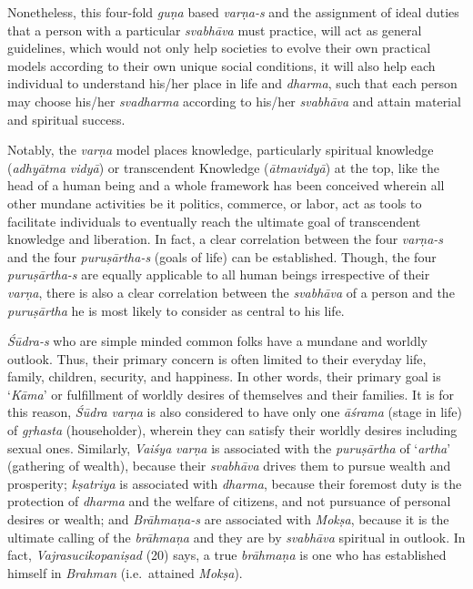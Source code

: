 Nonetheless, this four-fold \emph{guṇa} based \emph{varṇa-s} and the assignment of ideal duties that a person with a particular \emph{svabhāva} must practice, will act as general guidelines, which would not only help societies to evolve their own practical models according to their own unique social conditions, it will also help each individual to understand his/her place in life and \emph{dharma}, such that each person may choose his/her \emph{svadharma} according to his/her \emph{svabhāva} and attain material and spiritual success.

Notably, the \emph{varṇa} model places knowledge, particularly spiritual knowledge (\emph{adhyātma} \emph{vidyā}) or transcendent Knowledge (\emph{ātmavidyā}) at the top, like the head of a human being and a whole framework has been conceived wherein all other mundane activities be it politics, commerce, or labor, act as tools to facilitate individuals to eventually reach the ultimate goal of transcendent knowledge and liberation. In fact, a clear correlation between the four \emph{varṇa-s} and the four \emph{puruṣārtha-s} (goals of life) can be established. Though, the four \emph{puruṣārtha-s} are equally applicable to all human beings irrespective of their \emph{varṇa}, there is also a clear correlation between the \emph{svabhāva} of a person and the \emph{puruṣārtha} he is most likely to consider as central to his life.

\emph{Śūdra-s} who are simple minded common folks have a mundane and worldly outlook. Thus, their primary concern is often limited to their everyday life, family, children, security, and happiness. In other words, their primary goal is `\emph{Kāma}' or fulfillment of worldly desires of themselves and their families. It is for this reason, \emph{Śūdra} \emph{varṇa} is also considered to have only one \emph{āśrama} (stage in life) of \emph{gṛhasta} (householder), wherein they can satisfy their worldly desires including sexual ones. Similarly, \emph{Vaiśya} \emph{varṇa} is associated with the \emph{puruṣārtha} of `\emph{artha}' (gathering of wealth), because their \emph{svabhāva} drives them to pursue wealth and prosperity; \emph{kṣatriya} is associated with \emph{dharma}, because their foremost duty is the protection of \emph{dharma} and the welfare of citizens, and not pursuance of personal desires or wealth; and \emph{Brāhmaṇa-s} are associated with \emph{Mokṣa}, because it is the ultimate calling of the \emph{brāhmaṇa} and they are by \emph{svabhāva} spiritual in outlook. In fact, \emph{Vajrasucikopaniṣad} (20) says, a true \emph{brāhmaṇa} is one who has established himself in \emph{Brahman} (i.e.\ attained \emph{Mokṣa}).

